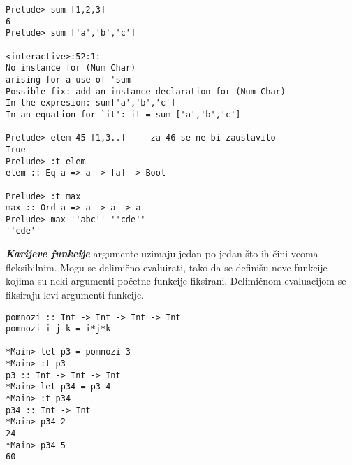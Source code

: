 \documentclass[../main.tex]{subfiles}
\begin{document}
\begin{boxprimer}[breakable]
\begin{Verbatim}
Prelude> sum [1,2,3]
6
Prelude> sum ['a','b','c']

<interactive>:52:1:
No instance for (Num Char)
arising for a use of 'sum'
Possible fix: add an instance declaration for (Num Char)
In the expresion: sum['a','b','c']
In an equation for `it': it = sum ['a','b','c']

Prelude> elem 45 [1,3..]  -- za 46 se ne bi zaustavilo
True
Prelude> :t elem
elem :: Eq a => a -> [a] -> Bool

Prelude> :t max
max :: Ord a => a -> a -> a
Prelude> max ''abc'' ''cde''
''cde''
\end{Verbatim}
\end{boxprimer}


\begin{multicols}{2}
{\it \bf Karijeve funkcije} argumente uzimaju jedan po jedan što ih čini veoma fleksibilnim. Mogu se delimično evaluirati, tako da se definišu nove funkcije kojima su neki argumenti početne funkcije fiksirani. Delimičnom evaluacijom se fiksiraju levi argumenti funkcije.

\columnbreak

\begin{boxprimer}
\begin{Verbatim}
pomnozi :: Int -> Int -> Int -> Int
pomnozi i j k = i*j*k

*Main> let p3 = pomnozi 3
*Main> :t p3
p3 :: Int -> Int -> Int
*Main> let p34 = p3 4
*Main> :t p34
p34 :: Int -> Int
*Main> p34 2
24
*Main> p34 5
60
\end{Verbatim}
\end{boxprimer}

\end{multicols}
\end{document}
